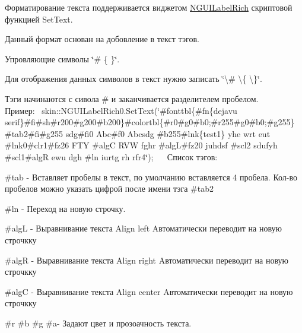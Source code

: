Форматирование текста поддерживается виджетом \hyperlink{class_n_g_u_i_label_rich}{N\+G\+U\+I\+Label\+Rich} скриптовой функцией Set\+Text.~\newline
 \begin{DoxyItemize}
\item Данный формат основан на добовление в текст тэгов.~\newline
 \item Упровляющие символы \char`\"{}\# \{ \}\char`\"{}. ~\newline
 \item Для отображения данных символов в текст нужно записать \char`\"{}\textbackslash{}\# \textbackslash{}\{ \textbackslash{}\}\char`\"{}. ~\newline
 \item Тэги начинаются с сивола \# и заканчивается разделителем пробелом. ~\newline
 ~\newline
 Пример\+:~\newline
 skin\+::\+N\+G\+U\+I\+Label\+Rich0.\+Set\+Text(\char`\"{}\#fonttbl\{\#fn\{dejavu serif\}\#fi\#sh\#r200\#g200\#b200\}\#colortbl\{\#r0\#g0\#b0;\#r255\#g0\#b0;\#g255\} \#tab2\#fi\#g255 sdg\#fi0 Abc\#f0 Abcsdg \#b255\#lnk\{test1\} yhe wrt eut \#lnk0\#clr1\#fz26 F\+T\+Y \#alg\+C R\+V\+W fghr \#alg\+L\#fz20 juhdsf \#scl2 sdufyh \#scl1\#alg\+R ewu   dgh \#ln iurtg rh rfr4\char`\"{});~\newline
~\newline
 Список тэгов\+: ~\newline
 \item \#tab -\/ Вставляет пробелы в текст, по умолчанию вставляется 4 пробела. Кол-\/во пробелов можно указать цифрой после имени тэга \#tab2~\newline
 \item \#ln -\/ Переход на новую строчку.~\newline
 \item \#algL -\/ Выравнивание текста Align left Aвтоматически переводит на новую строчкку~\newline
 \item \#algR -\/ Выравнивание текста Align right Aвтоматически переводит на новую строчкку~\newline
 \item \#algC -\/ Выравнивание текста Align center Aвтоматически переводит на новую строчкку~\newline
 \item \#r \#b \#g \#a-\/ Задают цвет и прозоачность текста. ~\newline

\end{DoxyItemize}
